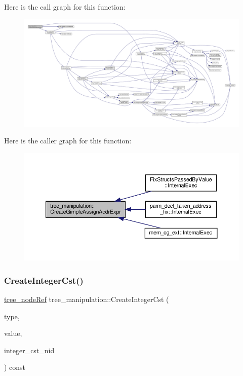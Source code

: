 Here is the call graph for this function\+:
\nopagebreak
\begin{figure}[H]
\begin{center}
\leavevmode
\includegraphics[width=350pt]{d0/d99/classtree__manipulation_af68e5e8accdf6b7d8b8b6dc2f5c91fb0_cgraph}
\end{center}
\end{figure}
Here is the caller graph for this function\+:
\nopagebreak
\begin{figure}[H]
\begin{center}
\leavevmode
\includegraphics[width=350pt]{d0/d99/classtree__manipulation_af68e5e8accdf6b7d8b8b6dc2f5c91fb0_icgraph}
\end{center}
\end{figure}
\mbox{\label{classtree__manipulation_ac77ee11b047981b9f464694c96e22238}} 
\subsubsection{\texorpdfstring{Create\+Integer\+Cst()}{CreateIntegerCst()}}
{\footnotesize\ttfamily \hyperlink{tree__node_8hpp_a6ee377554d1c4871ad66a337eaa67fd5}{tree\+\_\+node\+Ref} tree\+\_\+manipulation\+::\+Create\+Integer\+Cst (\begin{DoxyParamCaption}\item[{const \hyperlink{tree__node_8hpp_a3cf5d02292c940f3892425a5b5fdec3c}{tree\+\_\+node\+Const\+Ref} \&}]{type,  }\item[{const long long int}]{value,  }\item[{const unsigned int}]{integer\+\_\+cst\+\_\+nid }\end{DoxyParamCaption}) const}



